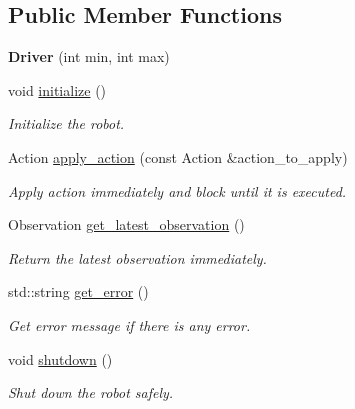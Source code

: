 \subsection*{Public Member Functions}
\begin{DoxyCompactItemize}
\item 
\mbox{\label{classrobot__interfaces_1_1example_1_1Driver_a83743c88f8873685b3b628e393ffe9fe}} 
{\bfseries Driver} (int min, int max)
\item 
void \hyperlink{classrobot__interfaces_1_1example_1_1Driver_ab6f6c3f3ffb730d162bec70313f8aab7}{initialize} ()
\begin{DoxyCompactList}\small\item\em Initialize the robot. \end{DoxyCompactList}\item 
Action \hyperlink{classrobot__interfaces_1_1example_1_1Driver_aa18b1bc90441395e86794a90dfdac9fa}{apply\+\_\+action} (const Action \&action\+\_\+to\+\_\+apply)
\begin{DoxyCompactList}\small\item\em Apply action immediately and block until it is executed. \end{DoxyCompactList}\item 
Observation \hyperlink{classrobot__interfaces_1_1example_1_1Driver_a2fa7ee03258e65037ed69d9a8363bfe8}{get\+\_\+latest\+\_\+observation} ()
\begin{DoxyCompactList}\small\item\em Return the latest observation immediately. \end{DoxyCompactList}\item 
std\+::string \hyperlink{classrobot__interfaces_1_1example_1_1Driver_a8465b912da8f11a6db271f11ff4eced1}{get\+\_\+error} ()
\begin{DoxyCompactList}\small\item\em Get error message if there is any error. \end{DoxyCompactList}\item 
void \hyperlink{classrobot__interfaces_1_1example_1_1Driver_a91cbe74896c9ed56ff7eee6380964dfe}{shutdown} ()
\begin{DoxyCompactList}\small\item\em Shut down the robot safely. \end{DoxyCompactList}\end{DoxyCompactItemize}
